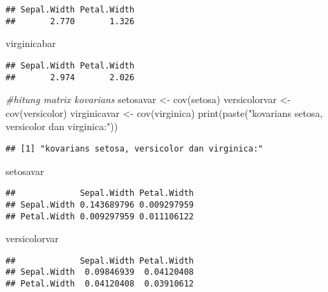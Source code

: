 \documentclass[
]{article}
\newenvironment{Shaded}{\begin{snugshade}}{\end{snugshade}}
\newcommand{\CommentTok}[1]{\textcolor[rgb]{0.56,0.35,0.01}{\textit{#1}}}
\newcommand{\FunctionTok}[1]{\textcolor[rgb]{0.00,0.00,0.00}{#1}}
\newcommand{\NormalTok}[1]{#1}
\newcommand{\OtherTok}[1]{\textcolor[rgb]{0.56,0.35,0.01}{#1}}
\newcommand{\StringTok}[1]{\textcolor[rgb]{0.31,0.60,0.02}{#1}}
\begin{document}
\begin{verbatim}
## Sepal.Width Petal.Width 
##       2.770       1.326
\end{verbatim}

\begin{Shaded}
\begin{Highlighting}[]
\NormalTok{virginicabar}
\end{Highlighting}
\end{Shaded}

\begin{verbatim}
## Sepal.Width Petal.Width 
##       2.974       2.026
\end{verbatim}

\begin{Shaded}
\begin{Highlighting}[]
\CommentTok{\#hitung matrix kovarians}
\NormalTok{setosavar }\OtherTok{\textless{}{-}} \FunctionTok{cov}\NormalTok{(setosa)}
\NormalTok{versicolorvar }\OtherTok{\textless{}{-}} \FunctionTok{cov}\NormalTok{(versicolor)}
\NormalTok{virginicavar }\OtherTok{\textless{}{-}} \FunctionTok{cov}\NormalTok{(virginica)}
\FunctionTok{print}\NormalTok{(}\FunctionTok{paste}\NormalTok{(}\StringTok{"kovarians setosa, versicolor dan virginica:"}\NormalTok{))}
\end{Highlighting}
\end{Shaded}

\begin{verbatim}
## [1] "kovarians setosa, versicolor dan virginica:"
\end{verbatim}

\begin{Shaded}
\begin{Highlighting}[]
\NormalTok{setosavar}
\end{Highlighting}
\end{Shaded}

\begin{verbatim}
##             Sepal.Width Petal.Width
## Sepal.Width 0.143689796 0.009297959
## Petal.Width 0.009297959 0.011106122
\end{verbatim}

\begin{Shaded}
\begin{Highlighting}[]
\NormalTok{versicolorvar}
\end{Highlighting}
\end{Shaded}

\begin{verbatim}
##             Sepal.Width Petal.Width
## Sepal.Width  0.09846939  0.04120408
## Petal.Width  0.04120408  0.03910612
\end{verbatim}
\end{document}
